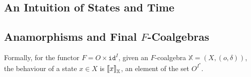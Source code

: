 %
%
%
\subsection{An Intuition of States and Time}
\subsection{Anamorphisms and Final $F$-Coalgebras}
Formally, for the functor $F=O\times \texttt{id}^I$, given an $F$-coalgebra $\mathbb{X}=(X,(o,\delta))$, the behaviour of a state $x\in X$ is ${{\llbracket x\rrbracket}}_{\mathbb{X}}$, an element of the set $O^{I^*}$. 

